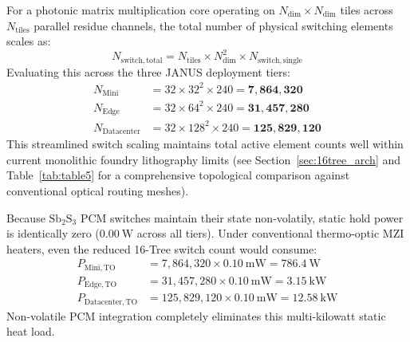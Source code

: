 \documentclass[journal]{IEEEtran}
\begin{document}
For a photonic matrix multiplication core operating on $N_{\mathrm{dim}} \times N_{\mathrm{dim}}$ tiles across $N_{\mathrm{tiles}}$ parallel residue channels, the total number of physical switching elements scales as:
\begin{equation}
N_{\mathrm{switch,total}} = N_{\mathrm{tiles}} \times N_{\mathrm{dim}}^2 \times N_{\mathrm{switch,single}}
\label{eq:total_switches}
\end{equation}
Evaluating this across the three JANUS deployment tiers:
\begin{align}
N_{\mathrm{Mini}}      &= 32 \times 32^2 \times 240 = \mathbf{7,864,320} \label{eq:switch_mini} \\
N_{\mathrm{Edge}}      &= 32 \times 64^2 \times 240 = \mathbf{31,457,280} \label{eq:switch_edge} \\
N_{\mathrm{Datacenter}} &= 32 \times 128^2 \times 240 = \mathbf{125,829,120} \label{eq:switch_dc}
\end{align}
This streamlined switch scaling maintains total active element counts well within current monolithic foundry lithography limits (see Section~\ref{sec:16tree_arch} and Table~\ref{tab:table5} for a comprehensive topological comparison against conventional optical routing meshes).

Because $\mathrm{Sb_2S_3}$ PCM switches maintain their state non-volatily, static hold power is identically zero ($0.00~\mathrm{W}$ across all tiers). Under conventional thermo-optic MZI heaters, even the reduced 16-Tree switch count would consume:
\begin{align}
P_{\mathrm{Mini,TO}}       &= 7{,}864{,}320 \times 0.10~\mathrm{mW} = 786.4~\mathrm{W} \\
P_{\mathrm{Edge,TO}}       &= 31{,}457{,}280 \times 0.10~\mathrm{mW} = 3.15~\mathrm{kW} \\
P_{\mathrm{Datacenter,TO}} &= 125{,}829{,}120 \times 0.10~\mathrm{mW} = 12.58~\mathrm{kW}
\end{align}
Non-volatile PCM integration completely eliminates this multi-kilowatt static heat load.
\end{document}
